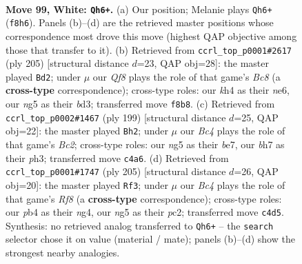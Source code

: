 \documentclass[11pt]{article}
\begin{document}
\clearpage

\begin{figure}[p]\centering
\begin{subfigure}{0.46\textwidth}\centering
\resizebox{\linewidth}{!}{%
\newchessgame
\chessboard[
  setfen={5Q2/2N4b/8/6n1/1pB3Pk/4K3/8/8 w - - 3 99},
  showmover=false,
  pgfstyle=straightmove, color=movearrow, markmove={f8-h6}
]}
\caption{}
\end{subfigure}\hfill
\begin{subfigure}{0.46\textwidth}\centering
\resizebox{\linewidth}{!}{%
\newchessgame
\chessboard[
  setfen={7k/5Kp1/4N3/6P1/8/3B4/8/2b5 b - - 74 103},
  showmover=false,
  pgfstyle=straightmove, color=movearrow, markmove={c1-d2}
]}
\caption{}
\end{subfigure}
\\[4pt]
\begin{subfigure}{0.46\textwidth}\centering
\resizebox{\linewidth}{!}{%
\newchessgame
\chessboard[
  setfen={8/2b1B3/4K1k1/5p2/8/5P1P/8/8 b - - 15 100},
  showmover=false,
  pgfstyle=straightmove, color=movearrow, markmove={c7-h2}
]}
\caption{}
\end{subfigure}\hfill
\begin{subfigure}{0.46\textwidth}\centering
\resizebox{\linewidth}{!}{%
\newchessgame
\chessboard[
  setfen={8/8/8/1k6/2p3N1/2K1B3/2P5/5r2 b - - 19 103},
  showmover=false,
  pgfstyle=straightmove, color=movearrow, markmove={f1-f3}
]}
\caption{}
\end{subfigure}
\caption{\textbf{Move 99, White: \texttt{Qh6+}.} (a) Our position; Melanie plays \texttt{Qh6+} (\texttt{f8h6}). Panels (b)--(d) are the retrieved master positions whose correspondence most drove this move (highest QAP objective among those that transfer to it). (b) Retrieved from \texttt{ccrl\_top\_p0001\#2617} (ply 205) [structural distance $d$=23, QAP obj=28]: the master played \texttt{Bd2}; under $\mu$ our \emph{Qf8} plays the role of that game's \emph{Bc8} (a \textbf{cross-type} correspondence); cross-type roles: our \emph{k}h4 as their \emph{n}e6, our \emph{n}g5 as their \emph{b}d3; transferred move \texttt{f8b8}. (c) Retrieved from \texttt{ccrl\_top\_p0002\#1467} (ply 199) [structural distance $d$=25, QAP obj=22]: the master played \texttt{Bh2}; under $\mu$ our \emph{Bc4} plays the role of that game's \emph{Bc2}; cross-type roles: our \emph{n}g5 as their \emph{b}e7, our \emph{b}h7 as their \emph{p}h3; transferred move \texttt{c4a6}. (d) Retrieved from \texttt{ccrl\_top\_p0001\#1747} (ply 205) [structural distance $d$=26, QAP obj=20]: the master played \texttt{Rf3}; under $\mu$ our \emph{Bc4} plays the role of that game's \emph{Rf8} (a \textbf{cross-type} correspondence); cross-type roles: our \emph{p}b4 as their \emph{n}g4, our \emph{n}g5 as their \emph{p}c2; transferred move \texttt{c4d5}. Synthesis: no retrieved analog transferred to \texttt{Qh6+} -- the \texttt{search} selector chose it on value (material / mate); panels (b)--(d) show the strongest nearby analogies.}
\label{fig:thought-m196}
\end{figure}
\end{document}
